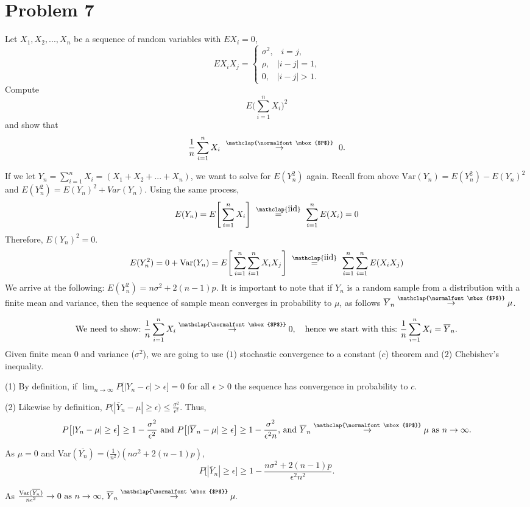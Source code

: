 \documentclass[11pt]{article}
\theoremstyle{definition}
\newcommand{\1}[1]{\mathbf{1} \left \{ #1 \right \}}
\newcommand\myeq{\stackrel{\mathclap{\normalfont\mbox{iid}}}{=}}
\newcommand\myequ{\stackrel{\mathclap{\normalfont\mbox{$P$}}}{\rightarrow}}
\begin{document}
\section{{\color{red} \textbf{Problem 7}}}
\item Let $X_1, X_2, ..., X_n$ be a sequence of random variables with $EX_i = 0$,
\[EX_iX_j =
\begin{cases}
\sigma^2\text{,} \quad i=j \text{,} \\
\rho \text{,} \quad |i - j| = 1 \text{,} \\
0 \text{,} \quad |i - j| > 1.
\end{cases}\]
Compute
\[E\Bigg(\sum_{i=1}^n X_i\Bigg)^2\]
and show that
\[\frac{1}{n}\sum_{i=1}^n X_i \ \myequ \ 0.\]
\item If we let \(Y_n = \sum_{i=1}^n X_i = (X_1 + X_2 + ... + X_n)\), we want to solve for $E(Y_n^2)$ again.
Recall from above \(\text{Var}(Y_n) = E(Y_n^2) - E(Y_n)^2\) and \(E(Y_n^2) = E(Y_n)^2 + Var(Y_n)\).  Using the same process,
\[E(Y_n) = E\Bigg[\sum_{i=1}^n X_i\Bigg] \ \myeq \ \sum_{i=1}^n E(X_i) = 0\]
Therefore, $E(Y_n)^2 = 0$.
\[E(Y_n^2) = 0 + \text{Var}(Y_n) = E\Bigg[\sum_{i=1}^n \sum_{i=1}^n X_i X_j\Bigg] \ \myeq \ \sum_{i=1}^n \sum_{i=1}^n E(X_i X_j)\]
We arrive at the following: \(E(Y_n^2) = n\sigma^2 + 2(n-1)p\).
It is important to note that if $Y_n$ is a random sample from a distribution with a finite mean and variance, then the sequence of sample mean converges in probability to $\mu$, as follows
\(\overline{Y}_n \myequ \mu\).

\[\text{We need to show:} \ \frac{1}{n}\sum_{i=1}^n X_i \myequ 0, \quad \text{hence we start with this:} \ \frac{1}{n}\sum_{i=1}^n X_i = \overline{Y}_n.\]
Given finite mean $0$ and variance ($\sigma^2$), we are going to use ($1$) stochastic convergence to a constant ($c$) theorem and ($2$) Chebishev's inequality.

\item (1) By definition, if \(\lim_{n\rightarrow \infty} P\big[|Y_n - c| > \epsilon \big] = 0\) for all $\epsilon > 0$ the sequence has convergence in probability to $c$.

\item (2) Likewise by definition, \(P\big(|\overline{Y}_n - \mu| \geq \epsilon \big) \leq \frac{\sigma^2}{\epsilon^2}\). Thus,
\[P\big[|{Y}_n - \mu| \geq \epsilon \big] \geq 1 -  \frac{\sigma^2}{\epsilon^2} \text{ and } P\big[|\overline{Y}_n - \mu| \geq \epsilon \big] \geq 1 -  \frac{\sigma^2}{\epsilon^2 n} \text{, and } \overline{Y}_n \myequ \mu \text{ as } n \rightarrow \infty.\]

As $\mu = 0$ and Var\((\overline{Y_n}) = \big(\frac{1}{n^2}\big)(n\sigma^2 + 2(n-1)p)\),
\[P\big[|\overline{Y}_n| \geq \epsilon \big] \geq 1 - \frac{n \sigma^2 + 2(n-1)p}{\epsilon^2 n^2}.\]

As \(\frac{\text{Var}(\overline{Y_n})}{n\epsilon^2} \rightarrow 0 \text{ as } n \rightarrow \infty\text{, } \overline{Y}_n \myequ \mu.\)
\end{document}
